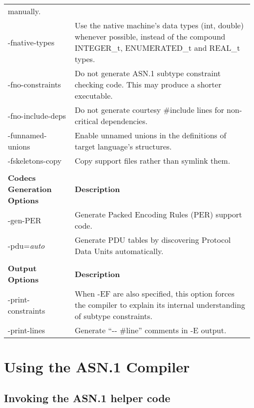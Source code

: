 \documentclass[english,oneside,12pt]{book}
\providecommand{\tabularnewline}{\\}
\begin{document}
\begin{longtable}{lp{4in}}
{manually. }\tabularnewline
{\small -fnative-types} & {\small Use the native machine's data types (int, double) whenever
possible, instead of the compound INTEGER\_t, ENUMERATED\_t and REAL\_t
types. }\tabularnewline
{\small -fno-constraints} & {\small Do not generate ASN.1 subtype constraint checking code. This
may produce a shorter executable.}\tabularnewline
{\small -fno-include-deps} & {\small Do not generate courtesy \#include lines for non-critical
dependencies.}\tabularnewline
{\small -funnamed-unions} & {\small Enable  unnamed  unions  in the definitions of target language's
structures.}\tabularnewline
{\small -fskeletons-copy} & {\small Copy support files rather than symlink them.}\tabularnewline
\midrule\tabularnewline
\textbf{\small Codecs Generation Options} & \textbf{\small Description}\tabularnewline
\midrule
{\small -gen-PER} & {\small Generate Packed Encoding Rules (PER) support code.}\tabularnewline
{\small -pdu=}\emph{\small auto} & {\small Generate PDU tables by discovering Protocol Data Units automatically.}\tabularnewline
\midrule\tabularnewline
\textbf{\small Output Options} & \textbf{\small Description}\tabularnewline
\midrule
{\small -print-constraints} & {\small When -EF are also specified, this option forces the compiler
to explain its internal understanding of subtype constraints.}\tabularnewline
{\small -print-lines} & {\small Generate ``-{}- \#line'' comments
in -E output.}\tabularnewline
\bottomrule
\end{longtable}
\renewcommand{\arraystretch}{1}


\chapter{Using the ASN.1 Compiler}


\section[Invoking the helper code]{Invoking the ASN.1 helper code}
\end{document}

